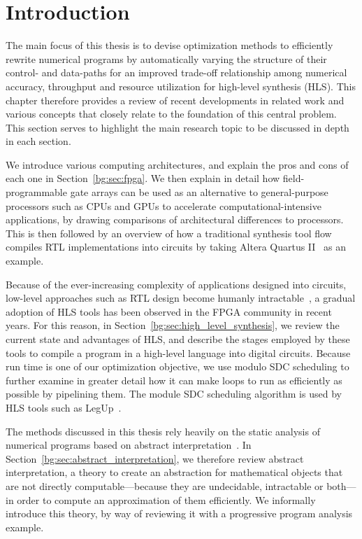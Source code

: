 \section{Introduction}
\label{bg:sec:introduction}

The main focus of this thesis is to devise optimization methods to efficiently
rewrite numerical programs by automatically varying the structure of their
control- and data-paths for an improved trade-off relationship among numerical
accuracy, throughput and resource utilization for high-level synthesis (HLS).
This chapter therefore provides a review of recent developments in related work
and various concepts that closely relate to the foundation of this central
problem.  This section serves to highlight the main research topic to be
discussed in depth in each section.

We introduce various computing architectures, and explain the pros and cons
of each one in Section~\ref{bg:sec:fpga}.  We then explain in detail how
field-programmable gate arrays can be used as an alternative to general-purpose
processors such as CPUs and GPUs to accelerate computational-intensive
applications, by drawing comparisons of architectural differences to
processors.  This is then followed by an overview of how a traditional
synthesis tool flow compiles RTL implementations into circuits by taking Altera
Quartus II~\cite{quartus} as an example.

Because of the ever-increasing complexity of applications designed
into circuits, low-level approaches such as RTL design become humanly
intractable~\cite{gajski}, a gradual adoption of HLS tools has been
observed in the FPGA community in recent years.  For this reason, in
Section~\ref{bg:sec:high_level_synthesis}, we review the current state and
advantages of HLS, and describe the stages employed by these tools to compile
a program in a high-level language into digital circuits.  Because run time
is one of our optimization objective, we use modulo SDC scheduling to further
examine in greater detail how it can make loops to run as efficiently as
possible by pipelining them.  The module SDC scheduling algorithm is used by
HLS tools such as LegUp~\cite{legup}.

The methods discussed in this thesis rely heavily on the static analysis of
numerical programs based on abstract interpretation~\cite{cousot77}.  In
Section~\ref{bg:sec:abstract_interpretation}, we therefore review abstract
interpretation, a theory to create an abstraction for mathematical objects that
are not directly computable---because they are undecidable, intractable or
both---in order to compute an approximation of them efficiently.  We informally
introduce this theory, by way of reviewing it with a progressive program
analysis example.

